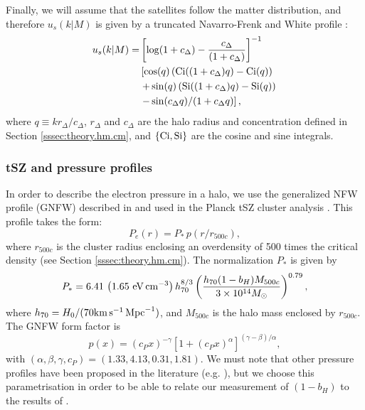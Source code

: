 \documentclass[useAMS,usenatbib]{mn2e}
\begin{document}
      Finally, we will assume that the satellites follow the matter distribution, and therefore $u_s(k|M)$ is given by a truncated Navarro-Frenk and White profile \citep{1996ApJ...462..563N}:
      \begin{align}
        u_s(k|M)=&\left[\log(1+c_\Delta)-\frac{c_\Delta}{(1+c_\Delta)}\right]^{-1}\\
               &\left[\cos(q)\left({\rm Ci}((1+c_\Delta)q)-{\rm Ci}(q)\right)\right.\\\nonumber
               &\left.+\sin(q)\left({\rm Si}((1+c_\Delta)q)-{\rm Si}(q)\right)\right.\\&\left.-\sin(c_\Delta q)/(1+c_\Delta q)\right],
      \end{align}
      where $q\equiv kr_\Delta/c_\Delta$, $r_\Delta$ and $c_\Delta$ are the halo radius and concentration defined in Section \ref{sssec:theory.hm.cm}, and $\{{\rm Ci}, {\rm Si}\}$ are the cosine and sine integrals.
      
    \subsubsection{tSZ and pressure profiles}\label{sssec:theory.hm.pe}
      In order to describe the electron pressure in a halo, we use the generalized NFW profile (GNFW) described in \cite{2010A&A...517A..92A} and used in the Planck tSZ cluster analysis \cite{2016A&A...594A..24P}. This profile takes the form:
      \begin{equation}
        P_e(r)=P_*\,p(r/r_{500c}),
      \end{equation}
      where $r_{500c}$ is the cluster radius enclosing an overdensity of 500 times the critical density (see Section \ref{sssec:theory.hm.cm}). The normalization $P_*$ is given by
      \begin{equation}\label{eq:arnaud_norm}
        P_*=6.41\,\left(1.65\,\, {\rm eV}\,{\rm cm}^{-3}\right)h_{70}^{8/3}
        \left(\frac{h_{70}(1-b_H)M_{500c}}{3\times10^{14}M_\odot}\right)^{0.79},
      \end{equation}
      where $h_{70}=H_0/(70 {\rm km}\,{\rm s}^{-1}\,{\rm Mpc}^{-1})$, and $M_{500c}$ is the halo mass enclosed by $r_{500c}$. The GNFW form factor is
      \begin{equation}
        p(x)=(c_P x)^{-\gamma}\left[1+(c_P x)^\alpha\right]^{(\gamma-\beta)/\alpha},
      \end{equation}
      with $(\alpha,\beta,\gamma,c_P)=(1.33,4.13,0.31,1.81)$. We must note that other pressure profiles have been proposed in the literature (e.g. \cite{2012ApJ...758...75B}), but we choose this parametrisation in order to be able to relate our measurement of $(1-b_H)$ to the results of \cite{2016A&A...594A..24P}.
      
\end{document}
